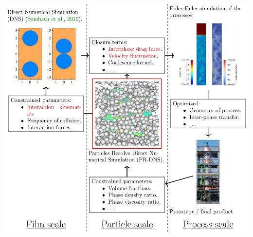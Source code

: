\documentclass{sintefbeamer}
\begin{document}
\begin{frame}
    \centering
    \includegraphics[height=1.1\textheight]{image/start.png}
\end{frame}
\end{document}
